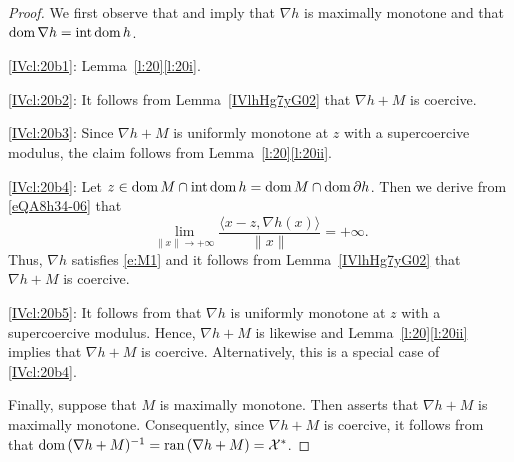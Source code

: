 \documentclass[a4paper,11pt,fleqn]{article}
\newcommand{\pair}[2]{\langle{{#1},{#2}}\rangle}
\newcommand{\XX}{\ensuremath{{\mathcal X}}}
\newcommand{\pinf}{\ensuremath{{+\infty}}}
\newcommand{\dom}{\ensuremath{\text{\rm dom}\,}}
\newcommand{\intdom}{\ensuremath{\text{\rm int\,dom}\,}}
\newcommand{\ran}{\ensuremath{\text{\rm ran}\,}}
\theoremstyle{plain}{\theorembodyfont{\rmfamily}%
\newtheorem{conjecture}[theorem]{Conjecture}}
\theoremstyle{plain}{\theorembodyfont{\rmfamily}%
\newtheorem{example}[theorem]{Example}}
\theoremstyle{plain}{\theorembodyfont{\rmfamily}%
\newtheorem{remark}[theorem]{Remark}}
\theoremstyle{plain}{\theorembodyfont{\rmfamily}%
\newtheorem{algorithm}[theorem]{Algorithm}}
\theoremstyle{plain}{\theorembodyfont{\rmfamily}%
\newtheorem{condition}[theorem]{Condition}}
\theoremstyle{plain}{\theorembodyfont{\rmfamily}%
\newtheorem{definition}[theorem]{Definition}}
\theoremstyle{plain}{\theorembodyfont{\rmfamily}
\newtheorem{problem}[theorem]{Problem}}
\theoremstyle{plain}{\theorembodyfont{\rmfamily}
\newtheorem{notation}[theorem]{Notation}}
\numberwithin{equation}{section}
\begin{document}
\begin{proof} 
We first observe that \cite[Theorem~18.7]{Simo08} and 
\cite[Theorem~5.6]{Ccm01} imply that $\nabla h$ is maximally 
monotone and that $\dom\nabla h=\intdom h$.

\ref{IVcl:20b1}: Lemma~\ref{l:20}\ref{l:20i}.

\ref{IVcl:20b2}: 
It follows from Lemma~\ref{IVlhHg7yG02} that
$\nabla h+M$ is coercive. 

\ref{IVcl:20b3}: Since $\nabla h+M$ is uniformly monotone at $z$ 
with a supercoercive modulus, the claim follows from 
Lemma~\ref{l:20}\ref{l:20ii}.

\ref{IVcl:20b4}: 
Let $z\in\dom M\cap\intdom h=\dom M\cap\dom\partial h$. 
Then we derive from 
\eqref{eQA8h34-06} that 
\begin{equation}
\lim_{\|x\|\to+\infty}\dfrac{\pair{x-z}{\nabla h(x)}}{\|x\|}=\pinf.
\end{equation}
Thus, $\nabla h$ satisfies \eqref{e:M1} and it follows from 
Lemma~\ref{IVlhHg7yG02} that $\nabla h+M$ is coercive. 

\ref{IVcl:20b5}: It follows from 
\cite[Definition~2.2 and Remark~2.8]{IVZali83} that $\nabla h$ is
uniformly monotone at $z$ with a supercoercive modulus. Hence, 
$\nabla h+M$ is likewise and Lemma~\ref{l:20}\ref{l:20ii} implies 
that $\nabla h+M$ is coercive. Alternatively, this is a special
case of \ref{IVcl:20b4}.

Finally, suppose that $M$ is maximally monotone. Then 
\cite[Theorem~24.1(a)]{Simo08} asserts that $\nabla h+M$ is 
maximally monotone. Consequently, since $\nabla h+M$ is 
coercive, it follows from 
\cite[Corollary~II-B.32.35]{ZeidXX} that
$\dom(\nabla h+M)^{-1}=\ran(\nabla h+M)=\XX^*$.
\end{proof}
\end{document}

